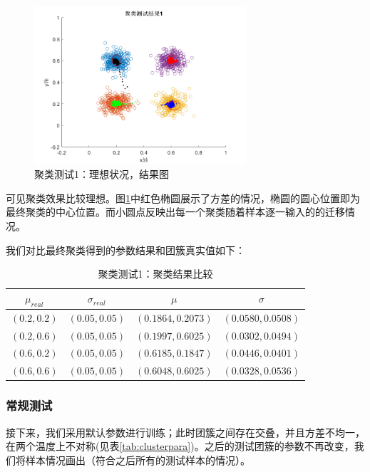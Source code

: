 \begin{figure}[htbp]
   \centering
   \includegraphics[width=0.7\textwidth]{ClusterTest1Result.png} %
   \caption{聚类测试1：理想状况，结果图}
   \label{fig:clustest1re}
\end{figure}

可见聚类效果比较理想。图\ref{fig:clustest1re}中红色椭圆展示了方差的情况，椭圆的圆心位置即为最终聚类的中心位置。而小圆点反映出每一个聚类随着样本逐一输入的的迁移情况。

我们对比最终聚类得到的参数结果和团簇真实值如下：
\begin{table}[htbp]
\centering
\begin{tabular}{c|c||c|c}
  \hline
  $\mu_{real}$   &  $\sigma_{real}$ &  $\mu$  &   $\sigma$\\
  \hline
  $(0.2,0.2)$    &  $(0.05,0.05)$   &  $(0.1864, 0.2073)$  & $(0.0580, 0.0508)$ \\
  $(0.2,0.6)$    &  $(0.05,0.05)$   &  $(0.1997, 0.6025)$  & $(0.0302, 0.0494)$ \\
  $(0.6,0.2)$    &  $(0.05,0.05)$   &  $(0.6185, 0.1847)$  & $(0.0446, 0.0401)$ \\
  $(0.6,0.6)$    &  $(0.05,0.05)$   &  $(0.6048, 0.6025)$  & $(0.0328, 0.0536)$ \\
  \hline
\end{tabular}
\caption{聚类测试1：聚类结果比较}
\label{tab:clustest1}
\end{table}

\subsubsection{常规测试}
接下来，我们采用默认参数进行训练；此时团簇之间存在交叠，并且方差不均一，在两个温度上不对称(见表\ref{tab:clusterpara})。之后的测试团簇的参数不再改变，我们将样本情况画出（符合之后所有的测试样本的情况）。

